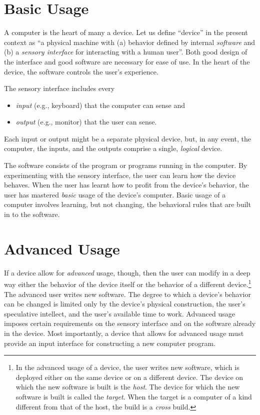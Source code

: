 \documentclass[twocolumn]{book}
\begin{document}
\section{Basic Usage}

A computer is the heart of many a device.  Let us define ``device'' in the
present context as ``a physical machine with (a) behavior defined by internal
\emph{software} and (b) a \emph{sensory interface} for interacting with a human
user''.  Both good design of the interface and good software are necessary for
ease of use.  In the heart of the device, the software controls the user's
experience.

The sensory interface includes every
\begin{itemize}
   \item \emph{input} (e.g., keyboard) that the computer can sense and
   \item \emph{output} (e.g., monitor) that the user can sense.
\end{itemize}
Each input or output might be a separate physical device, but, in any event,
the computer, the inputs, and the outputs comprise a single, \emph{logical}
device.

The software consists of the program or programs running in the computer.  By
experimenting with the sensory interface, the user can learn how the device
behaves.  When the user has learnt how to profit from the device's behavior,
the user has mastered \emph{basic} usage of the device's computer.  Basic usage
of a computer involves learning, but not changing, the behavioral rules that
are built in to the software.

\section{Advanced Usage}

If a device allow for \emph{advanced} usage, though, then the user can modify
in a deep way either the behavior of the device itself or the behavior of a
different device.\footnote{%
   In the advanced usage of a device, the user writes new software, which is
   deployed either on the same device or on a different device.  The device on
   which the new software is built is the \emph{host}.  The device for which
   the new software is built is called the \emph{target}.  When the target is a
   computer of a kind different from that of the host, the build is a
   \emph{cross} build.}
The advanced user writes new software.  The degree to which a device's behavior
can be changed is limited only by the device's physical construction, the
user's speculative intellect, and the user's available time to work.  Advanced
usage imposes certain requirements on the sensory interface and on the software
already in the device.  Most importantly, a device that allows for advanced
usage must provide an input interface for constructing a new computer program.
\end{document}
